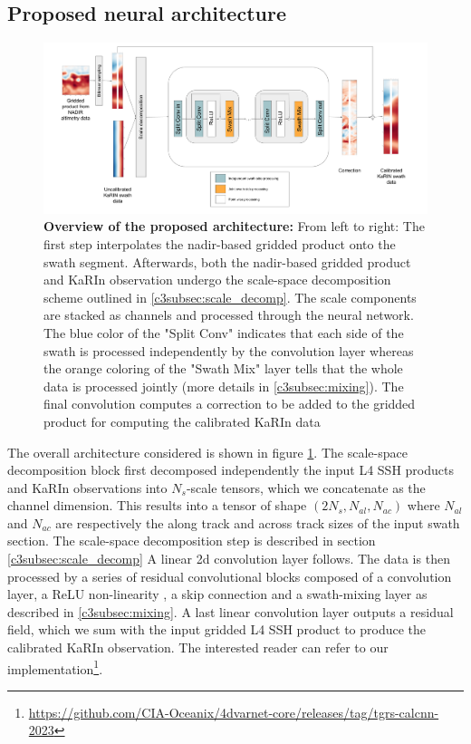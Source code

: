 \begin{bibunit}
\subsection{Proposed neural architecture}
\label{c3subsec:neural_arch}
\noindent
\begin{figure}
    \begin{center}
	    \includegraphics[width=\textwidth]{00_Calib/CalDiag2.png}
    \end{center}
    \caption{\textbf{Overview of the proposed architecture:} From left to right: The first step interpolates the nadir-based gridded product onto the swath segment. Afterwards, both the nadir-based gridded product and KaRIn observation undergo the scale-space decomposition scheme outlined in \ref{c3subsec:scale_decomp}. The scale components are stacked as channels and processed through the neural network. The blue color of the "Split Conv" indicates that each side of the swath is processed independently by the convolution layer whereas the orange coloring of the "Swath Mix" layer tells that the whole data is processed jointly (more details in \ref{c3subsec:mixing}). The final convolution computes a correction to be added to the gridded product for computing the calibrated KaRIn data}
    \label{c3fig:arch}	
\end{figure}
The overall architecture considered is shown in figure \ref{c3fig:arch}. The scale-space decomposition block first decomposed independently the input L4 SSH products and KaRIn observations
into $N_s$-scale tensors, which we concatenate as the channel dimension.
This results into a tensor of shape $(2N_s, N_{al}, N_{ac})$ where $N_{al}$ and $N_{ac}$ are respectively the along track and across track sizes of the input swath section. The scale-space decomposition step is described in section \ref{c3subsec:scale_decomp}
A linear 2{\sc d} convolution layer follows. 
The data is then processed by a series of residual convolutional blocks composed of a convolution layer, a ReLU non-linearity \cite{Nair_Hinton_2019}, a skip connection and a swath-mixing layer as described in \ref{c3subsec:mixing}. A last linear convolution layer outputs a residual field, which we sum with the input gridded L4 SSH product to produce the calibrated KaRIn observation.
The interested reader can refer to our implementation\footnote{\url{https://github.com/CIA-Oceanix/4dvarnet-core/releases/tag/tgrs-calcnn-2023}}.




\end{bibunit}
